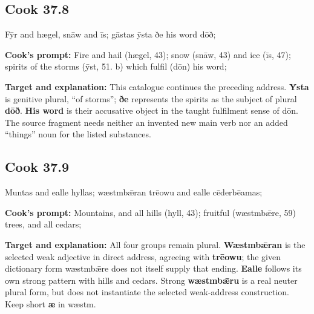 \par\begin{minipage}{\linewidth}\raggedright
\subsection*{Cook 37.8}

Fȳr and hægel, snāw and īs; gāstas ȳsta ðe his word dōð;

\textbf{Cook's prompt:} Fire and hail (hægel, 43); snow (snāw, 43) and ice (īs, 47); spirits of the storms (ȳst, 51. b) which fulfil (dōn) his word;

\textbf{Target and explanation:} This catalogue continues the preceding address. \textbf{Ȳsta} is genitive plural, “of storms”; \textbf{ðe} represents the spirits as the subject of plural \textbf{dōð}. \textbf{His word} is their accusative object in the taught fulfilment sense of dōn. The source fragment needs neither an invented new main verb nor an added “things” noun for the listed substances.

\end{minipage}\par\addvspace{4pt}

\par\begin{minipage}{\linewidth}\raggedright
\subsection*{Cook 37.9}

Muntas and ealle hyllas; wæstmbǣran trēowu and ealle cēderbēamas;

\textbf{Cook's prompt:} Mountains, and all hills (hyll, 43); fruitful (wæstmbǣre, 59) trees, and all cedars;

\textbf{Target and explanation:} All four groups remain plural. \textbf{Wæstmbǣran} is the selected weak adjective in direct address, agreeing with \textbf{trēowu}; the given dictionary form wæstmbǣre does not itself supply that ending. \textbf{Ealle} follows its own strong pattern with hills and cedars. Strong \textbf{wæstmbǣru} is a real neuter plural form, but does not instantiate the selected weak-address construction. Keep short \textbf{æ} in wæstm.

\end{minipage}\par\addvspace{4pt}


